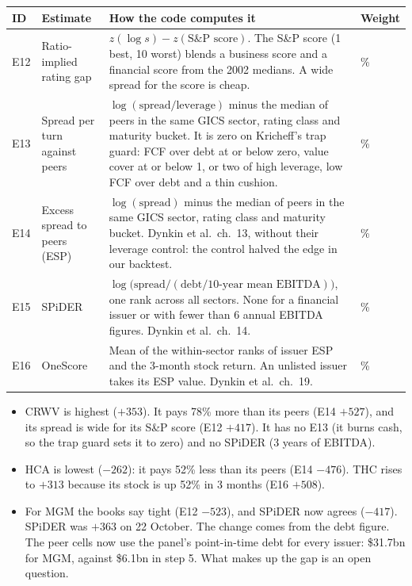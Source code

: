 \newpage
{}
{\footnotesize
\begin{tabularx}{\linewidth}{@{}>{\raggedright\arraybackslash}p{8mm}>{\raggedright\arraybackslash}p{34mm}>{\raggedright\arraybackslash}X>{\raggedright\arraybackslash}p{12mm}@{}}
\toprule
ID & Estimate & How the code computes it & Weight \\
\midrule
E12 & Ratio-implied rating gap & $z(\log s) - z(\text{S\&P score})$. The S\&P score (1 best, 10 worst) blends a business score and a financial score from the 2002 medians. A wide spread for the score is cheap. & 2.5\% \\
E13 & Spread per turn against peers & $\log(\text{spread}/\text{leverage})$ minus the median of peers in the same GICS sector, rating class and maturity bucket. It is zero on Kricheff's trap guard: FCF over debt at or below zero, value cover at or below 1, or two of high leverage, low FCF over debt and a thin cushion. & 2.5\% \\
E14 & Excess spread to peers (ESP) & $\log(\text{spread})$ minus the median of peers in the same GICS sector, rating class and maturity bucket. Dynkin et al.\ ch.~13, without their leverage control: the control halved the edge in our backtest. & 4.5\% \\
E15 & SPiDER & $\log\big(\text{spread} / (\text{debt} / \text{10-year mean EBITDA})\big)$, one rank across all sectors. None for a financial issuer or with fewer than 6 annual EBITDA figures. Dynkin et al.\ ch.~14. & 3\% \\
E16 & OneScore & Mean of the within-sector ranks of issuer ESP and the 3-month stock return. An unlisted issuer takes its ESP value. Dynkin et al.\ ch.~19. & 4.5\% \\
\bottomrule
\end{tabularx}
}

\begin{center}
\scalebox{0.72}{}
\end{center}
\begin{itemize}
\item CRWV is highest ($+353$). It pays 78\% more than its peers (E14 $+527$), and its spread is wide for its S\&P score (E12 $+417$). It has no E13 (it burns cash, so the trap guard sets it to zero) and no SPiDER (3 years of EBITDA).
\item HCA is lowest ($-262$): it pays 52\% less than its peers (E14 $-476$). THC rises to $+313$ because its stock is up 52\% in 3 months (E16 $+508$).
\item For MGM the books say tight (E12 $-523$), and SPiDER now agrees ($-417$). SPiDER was $+363$ on 22 October. The change comes from the debt figure. The peer cells now use the panel's point-in-time debt for every issuer: \$31.7bn for MGM, against \$6.1bn in step 5. What makes up the gap is an open question.
\end{itemize}


